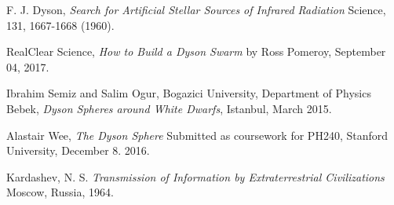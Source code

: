 \documentclass[a4paper]{article}
\begin{document}
\appendix

\begin{thebibliography}{9}

 F. J. Dyson, \emph{Search for Artificial Stellar Sources of Infrared Radiation} Science, 131, 1667-1668 (1960).

 RealClear Science, \emph{How to Build a Dyson Swarm} by Ross Pomeroy, September 04, 2017.

 Ibrahim Semiz and Salim Ogur, Bogazici University,
Department of Physics Bebek, \emph{Dyson Spheres around White Dwarfs}, Istanbul, March 2015.

 Alastair Wee, \emph{The Dyson Sphere} Submitted as coursework for PH240, Stanford University, December 8. 2016.

 Kardashev, N. S. \emph{Transmission of Information by Extraterrestrial Civilizations} Moscow, Russia, 1964.

\end{thebibliography}
\end{document}
